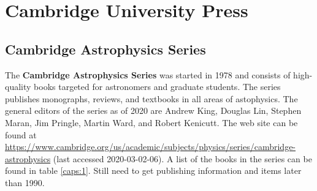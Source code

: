 \section{Cambridge University Press}

\subsection{Cambridge Astrophysics Series}

The {\bfseries Cambridge Astrophysics Series} was started in 1978 and
consists of high-quality books targeted for astronomers and graduate
students. The series publishes monographs, reviews, and textbooks in
all areas of astophysics. The general editors of the series as of 2020
are Andrew King, Douglas Lin, Stephen Maran, Jim Pringle, Martin Ward,
and Robert Kenicutt.  The web site can be found at
\url{https://www.cambridge.org/us/academic/subjects/physics/series/cambridge-astrophysics}
(last accessed 2020-03-02-06).  A list of the books in the series can
be found in table \ref{caps:1}.  Still need to get publishing
information and items later than 1990.
